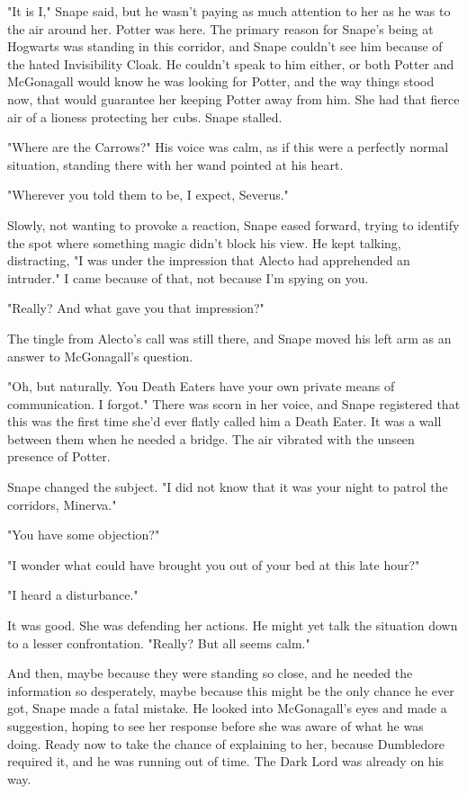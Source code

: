 "It is I," Snape said, but he wasn't paying as much attention to her as he was to the air around her. Potter was here. The primary reason for Snape's being at Hogwarts was standing in this corridor, and Snape couldn't see him because of the hated Invisibility Cloak. He couldn't speak to him either, or both Potter and McGonagall would know he was looking for Potter, and the way things stood now, that would guarantee her keeping Potter away from him. She had that fierce air of a lioness protecting her cubs. Snape stalled.

"Where are the Carrows?" His voice was calm, as if this were a perfectly normal situation, standing there with her wand pointed at his heart.

"Wherever you told them to be, I expect, Severus."

Slowly, not wanting to provoke a reaction, Snape eased forward, trying to identify the spot where something magic didn't block his view. He kept talking, distracting, "I was under the impression that Alecto had apprehended an intruder." I came because of that, not because I'm spying on you.

"Really? And what gave you that impression?"

The tingle from Alecto's call was still there, and Snape moved his left arm as an answer to McGonagall's question.

"Oh, but naturally. You Death Eaters have your own private means of communication. I forgot." There was scorn in her voice, and Snape registered that this was the first time she'd ever flatly called him a Death Eater. It was a wall between them when he needed a bridge. The air vibrated with the unseen presence of Potter.

Snape changed the subject. "I did not know that it was your night to patrol the corridors, Minerva."

"You have some objection?"

"I wonder what could have brought you out of your bed at this late hour?"

"I heard a disturbance."

It was good. She was defending her actions. He might yet talk the situation down to a lesser confrontation. "Really? But all seems calm."

And then, maybe because they were standing so close, and he needed the information so desperately, maybe because this might be the only chance he ever got, Snape made a fatal mistake. He looked into McGonagall's eyes and made a suggestion, hoping to see her response before she was aware of what he was doing. Ready now to take the chance of explaining to her, because Dumbledore required it, and he was running out of time. The Dark Lord was already on his way.


